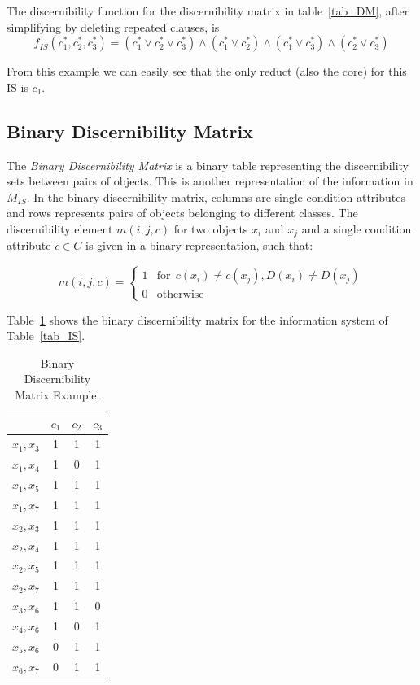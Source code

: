 \documentclass[authoryear,11pt]{elsarticle}
\begin{document}
  The discernibility function for the discernibility matrix in table~\ref{tab_DM}, after simplifying by 
  deleting repeated clauses, is  
  $$f_{IS}(c_1^*,c_2^*,c_3^*)=(c_1^* \vee c_2^* \vee c_3^*) \wedge (c_1^* \vee c_2^*) 
   \wedge (c_1^* \vee c_3^*) \wedge (c_2^* \vee c_3^*) $$
  
  From this example we can easily see that the only reduct (also the core) for this IS is $c_1$.
  
\subsection{Binary Discernibility Matrix}
  The \textit{Binary Discernibility Matrix} is a binary table representing the discernibility sets between pairs 
  of objects. This is another representation of the information in $M_{IS}$. In the binary discernibility
  matrix, columns are single condition attributes and rows represents pairs of objects belonging to different 
  classes. The discernibility element $m(i, j, c)$ for two objects $x_i$ and $x_j$ and a single condition 
  attribute $c \in C$ is given in a binary representation, such that:
  
  \begin{equation}
  	m(i, j, c)=\left\lbrace\begin{array}{cl}
  			1 & \mathrm{for~~}c(x_i) \neq c(x_j),D(x_i) \neq D(x_j)\\
  			0 								   & \mathrm{otherwise} 
  	\end{array}\right.
  \end{equation} 
  
  Table~\ref{tab_BDM} shows the binary discernibility matrix for the information system of Table~\ref{tab_IS}.  
  
  \begin{table}[htb]
		\caption{Binary Discernibility Matrix Example.} \label{tab_BDM}
		\centering
 	\begin{tabular}{cccc}
 		& $c_1$ & $c_2$ & $c_3$\\
 		\hline
		$x_1,x_3$ & 1 & 1 & 1 \\
		$x_1,x_4$ & 1 & 0 & 1 \\
		$x_1,x_5$ & 1 & 1 & 1 \\
		$x_1,x_7$ & 1 & 1 & 1 \\
		$x_2,x_3$ & 1 & 1 & 1 \\
		$x_2,x_4$ & 1 & 1 & 1 \\
		$x_2,x_5$ & 1 & 1 & 1 \\
		$x_2,x_7$ & 1 & 1 & 1 \\
		$x_3,x_6$ & 1 & 1 & 0 \\
		$x_4,x_6$ & 1 & 0 & 1 \\
		$x_5,x_6$ & 0 & 1 & 1 \\
		$x_6,x_7$ & 0 & 1 & 1 
 	\end{tabular}             
  \end{table}
  
\end{document}
